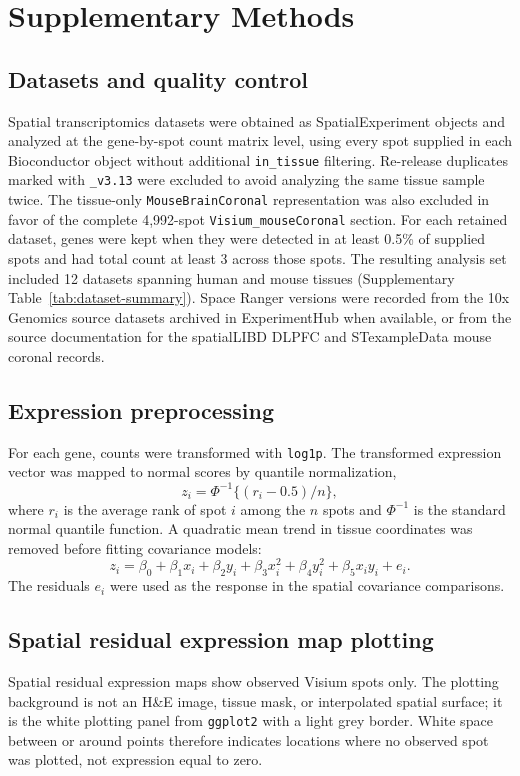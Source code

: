 \clearpage
\section{Supplementary Methods}

\subsection{Datasets and quality control}
Spatial transcriptomics datasets were obtained as SpatialExperiment objects and analyzed at the gene-by-spot count matrix level, using every spot supplied in each Bioconductor object without additional \texttt{in\_tissue} filtering. Re-release duplicates marked with \texttt{\_v3.13} were excluded to avoid analyzing the same tissue sample twice. The tissue-only \texttt{MouseBrainCoronal} representation was also excluded in favor of the complete 4,992-spot \texttt{Visium\_mouseCoronal} section. For each retained dataset, genes were kept when they were detected in at least 0.5\% of supplied spots and had total count at least 3 across those spots. The resulting analysis set included 12 datasets spanning human and mouse tissues (Supplementary Table~\ref{tab:dataset-summary}). Space Ranger versions were recorded from the 10x Genomics source datasets archived in ExperimentHub when available, or from the source documentation for the spatialLIBD DLPFC and STexampleData mouse coronal records.

\subsection{Expression preprocessing}
For each gene, counts were transformed with \texttt{log1p}. The transformed expression vector was mapped to normal scores by quantile normalization,
\[
z_i = \Phi^{-1}\{(r_i - 0.5)/n\},
\]
where \(r_i\) is the average rank of spot \(i\) among the \(n\) spots and \(\Phi^{-1}\) is the standard normal quantile function. A quadratic mean trend in tissue coordinates was removed before fitting covariance models:
\[
z_i = \beta_0 + \beta_1 x_i + \beta_2 y_i + \beta_3 x_i^2 + \beta_4 y_i^2 + \beta_5 x_i y_i + e_i.
\]
The residuals \(e_i\) were used as the response in the spatial covariance comparisons.

\subsection{Spatial residual expression map plotting}
Spatial residual expression maps show observed Visium spots only. The plotting background is not an H\&E image, tissue mask, or interpolated spatial surface; it is the white plotting panel from \texttt{ggplot2} with a light grey border. White space between or around points therefore indicates locations where no observed spot was plotted, not expression equal to zero.

